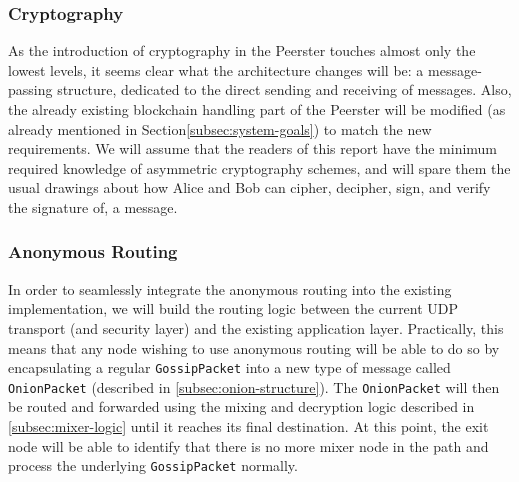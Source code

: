 \documentclass[11pt, a4paper]{article}
\begin{document}


        \subsubsection{Cryptography}

            As the introduction of cryptography in the Peerster touches almost only the lowest levels, it seems clear what the architecture changes will be: a message-passing structure, dedicated to the direct sending and receiving of messages.
            Also, the already existing blockchain handling part of the Peerster will be modified (as already mentioned in Section\ref{subsec:system-goals}) to match the new requirements.
            \bigbreak
            We will assume that the readers of this report have the minimum required knowledge of asymmetric cryptography schemes, and will spare them the usual drawings about how Alice and Bob can cipher, decipher, sign, and verify the signature of, a message.
            \bigbreak

        \subsubsection{Anonymous Routing}

            In order to seamlessly integrate the anonymous routing into the existing implementation, we will build the routing logic between the current UDP transport (and security layer) and the existing application layer.
            Practically, this means that any node wishing to use anonymous routing will be able to do so by encapsulating a regular \texttt{GossipPacket} into a new type of message called \texttt{OnionPacket} (described in \ref{subsec:onion-structure}).
            The \texttt{OnionPacket} will then be routed and forwarded using the mixing and decryption logic described in \ref{subsec:mixer-logic} until it reaches its final destination.
            At this point, the exit node will be able to identify that there is no more mixer node in the path and process the underlying \texttt{GossipPacket} normally.
\end{document}
